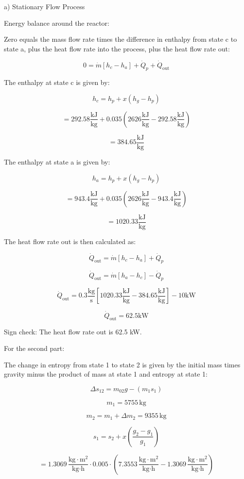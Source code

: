 a) Stationary Flow Process

Energy balance around the reactor:

Zero equals the mass flow rate times the difference in enthalpy from state c to state a, plus the heat flow rate into the process, plus the heat flow rate out:

\[ 0 = \dot{m} [h_c - h_a] + \dot{Q}_p + \dot{Q}_{\text{out}} \]

The enthalpy at state c is given by:

\[ h_c = h_{p} + x (h_{g} - h_{p}) \]

\[ = 292.58 \frac{\text{kJ}}{\text{kg}} + 0.035 \left( 2626 \frac{\text{kJ}}{\text{kg}} - 292.58 \frac{\text{kJ}}{\text{kg}} \right) \]

\[ = 384.65 \frac{\text{kJ}}{\text{kg}} \]

The enthalpy at state a is given by:

\[ h_a = h_{p} + x (h_{g} - h_{p}) \]

\[ = 943.4 \frac{\text{kJ}}{\text{kg}} + 0.035 \left( 2626 \frac{\text{kJ}}{\text{kg}} - 943.4 \frac{\text{kJ}}{\text{kg}} \right) \]

\[ = 1020.33 \frac{\text{kJ}}{\text{kg}} \]

The heat flow rate out is then calculated as:

\[ \dot{Q}_{\text{out}} = \dot{m} [h_c - h_a] + \dot{Q}_p \]

\[ \dot{Q}_{\text{out}} = \dot{m} [h_a - h_c] - \dot{Q}_p \]

\[ \dot{Q}_{\text{out}} = 0.3 \frac{\text{kg}}{\text{s}} [1020.33 \frac{\text{kJ}}{\text{kg}} - 384.65 \frac{\text{kJ}}{\text{kg}}] - 10 \text{kW} \]

\[ \dot{Q}_{\text{out}} = 62.5 \text{kW} \]

Sign check: The heat flow rate out is 62.5 kW.

For the second part:

The change in entropy from state 1 to state 2 is given by the initial mass times gravity minus the product of mass at state 1 and entropy at state 1:

\[ \Delta s_{12} = m_{02}g - (m_1 s_1) \]

\[ m_1 = 5755 \, \text{kg} \]

\[ m_2 = m_1 + \Delta m_2 = 9355 \, \text{kg} \]

\[ s_1 = s_2 + x \left( \frac{g_2 - g_1}{g_1} \right) \]

\[ = 1.3069 \, \frac{\text{kg} \cdot \text{m}^2}{\text{kg} \cdot \text{h}} \cdot 0.005 \cdot (7.3553 \, \frac{\text{kg} \cdot \text{m}^2}{\text{kg} \cdot \text{h}} - 1.3069 \, \frac{\text{kg} \cdot \text{m}^2}{\text{kg} \cdot \text{h}}) \]

